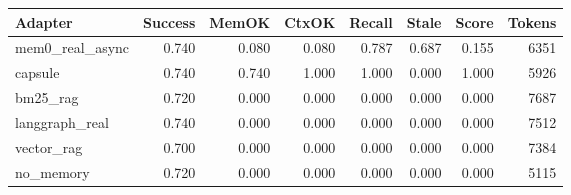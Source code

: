 \begin{tabular}{lrrrrrrr}
\hline
Adapter & Success & MemOK & CtxOK & Recall & Stale & Score & Tokens \\
\hline
mem0\_real\_async & 0.740 & 0.080 & 0.080 & 0.787 & 0.687 & 0.155 & 6351 \\
capsule & 0.740 & 0.740 & 1.000 & 1.000 & 0.000 & 1.000 & 5926 \\
bm25\_rag & 0.720 & 0.000 & 0.000 & 0.000 & 0.000 & 0.000 & 7687 \\
langgraph\_real & 0.740 & 0.000 & 0.000 & 0.000 & 0.000 & 0.000 & 7512 \\
vector\_rag & 0.700 & 0.000 & 0.000 & 0.000 & 0.000 & 0.000 & 7384 \\
no\_memory & 0.720 & 0.000 & 0.000 & 0.000 & 0.000 & 0.000 & 5115 \\
\hline
\end{tabular}
